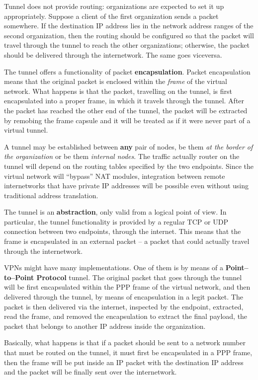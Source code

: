 \documentclass[10pt]{extbook}
\begin{document}
Tunnel does not provide routing: organizations are expected to set it up
appropriately. Suppose a client of the first organization sends a packet
somewhere. If the destination IP address lies in the network address ranges of
the second organization, then the routing should be configured so that the
packet will travel through the tunnel to reach the other organizations;
otherwise, the packet should be delivered through the internetwork. The same
goes viceversa.

The tunnel offers a functionality of packet \textbf{encapsulation}. Packet
encapsulation means that the original packet is enclosed within the
\emph{frame} of the virtual network. What happens is that the packet,
travelling on the tunnel, is first encapsulated into a proper frame, in which
it travels through the tunnel. After the packet has reached the other end of
the tunnel, the packet will be extracted by remobing the frame capsule and it
will be treated as if it were never part of a virtual tunnel.

A tunnel may be established between \textbf{any} pair of nodes, be them
\emph{at the border of the organization} or be them \emph{internal nodes}. The
traffic actually router on the tunnel will depend on the routing tables
specified by the two endpoints. Since the virtual network will ``bypass'' NAT
modules, integration between remote internetworks that have private IP
addresses will be possible even without using traditional address translation.

The tunnel is an \textbf{abstraction}, only valid from a logical point of view.
In particular, the tunnel functionality is provided by a regular TCP or UDP
connection between two endpoints, through the internet. This means that the
frame is encapsulated in an external packet -- a packet that could actually
travel through the internetwork.

VPNs might have many implementations. One of them is by means of a
\textbf{Point--to--Point Protocol} tunnel. The original packet that goes
through the tunnel will be first encapsulated within the PPP frame of the
virtual network, and then delivered through the tunnel, by means of
encapsulation in a legit packet. The packet is then delivered via the internet,
inspected by the endpoint, extracted, read the frame, and removed the
encapsulation to extract the final payload, the packet that belongs to another
IP address inside the organization.

Basically, what happens is that if a packet should be sent to a network number
that must be routed on the tunnel, it must first be encapsulated in a PPP
frame, then the frame will be put inside an IP packet with the destination IP
address and the packet will be finally sent over the internetwork.
\end{document}
